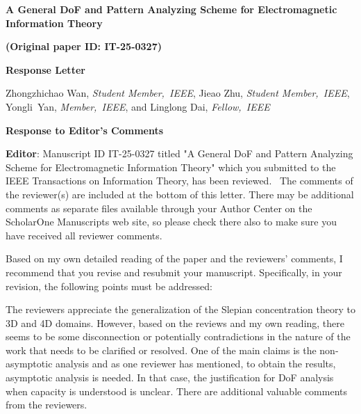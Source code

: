 \documentclass[a4paper,12pt]{article}
\begin{document}
\begin{center}
 {\Large\bf A General DoF and Pattern Analyzing Scheme for Electromagnetic Information Theory}
\end{center}
\begin{center}
 {\Large\bf (Original paper ID: IT-25-0327)}
\end{center}
\begin{center}
 {\Large\bf Response Letter}
\end{center}
\begin{center}
Zhongzhichao Wan, {\it Student Member,~IEEE}, Jieao Zhu, {\it Student Member,~IEEE}, \\Yongli~Yan, {\it Member,~IEEE}, and Linglong Dai, {\it Fellow,~IEEE}

\end{center}
\vspace*{+2mm}
\begin{center}
 {\Large\bf Response to Editor's Comments}
\end{center}


\textbf{Editor}: Manuscript ID IT-25-0327 titled "A General DoF and Pattern Analyzing Scheme for Electromagnetic Information Theory" which you submitted to the IEEE Transactions on Information Theory, has been reviewed.  The comments of the reviewer(s) are included at the bottom of this letter. There may be additional comments as separate files available through your Author Center on the ScholarOne Manuscripts web site, so please check there also to make sure you have received all reviewer comments.

\quad Based on my own detailed reading of the paper and the reviewers’ comments, I recommend that you revise and resubmit your manuscript. Specifically, in your revision, the following points must be addressed:

\quad The reviewers appreciate the generalization of the Slepian concentration theory to 3D and 4D domains. However, based on the reviews and my own reading, there seems to be some disconnection or potentially contradictions in the nature of the work that needs to be clarified or resolved. One of the main claims is the non-asymptotic analysis and as one reviewer has mentioned, to obtain the results, asymptotic analysis is needed. In that case, the justification for DoF analysis when capacity is understood is unclear. There are additional valuable comments from the reviewers.
\end{document}
